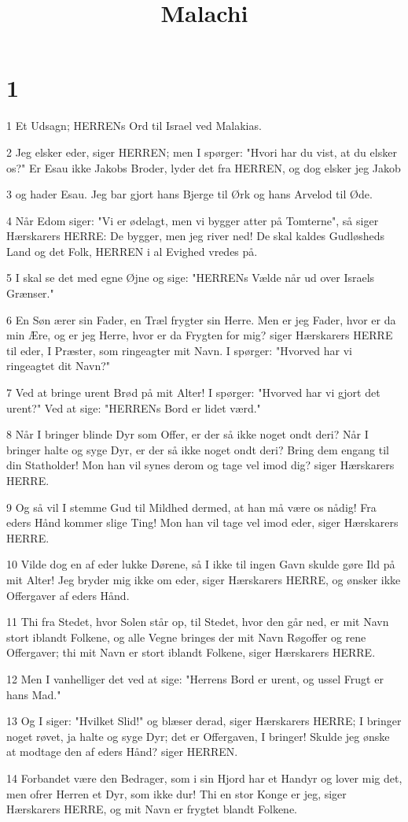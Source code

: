 

\title{Malachi}


\chapter{1}

\par 1 Et Udsagn; HERRENs Ord til Israel ved Malakias.
\par 2 Jeg elsker eder, siger HERREN; men I spørger: "Hvori har du vist, at du elsker os?" Er Esau ikke Jakobs Broder, lyder det fra HERREN, og dog elsker jeg Jakob
\par 3 og hader Esau. Jeg bar gjort hans Bjerge til Ørk og hans Arvelod til Øde.
\par 4 Når Edom siger: "Vi er ødelagt, men vi bygger atter på Tomterne", så siger Hærskarers HERRE: De bygger, men jeg river ned! De skal kaldes Gudløsheds Land og det Folk, HERREN i al Evighed vredes på.
\par 5 I skal se det med egne Øjne og sige: "HERRENs Vælde når ud over Israels Grænser."
\par 6 En Søn ærer sin Fader, en Træl frygter sin Herre. Men er jeg Fader, hvor er da min Ære, og er jeg Herre, hvor er da Frygten for mig? siger Hærskarers HERRE til eder, I Præster, som ringeagter mit Navn. I spørger: "Hvorved har vi ringeagtet dit Navn?"
\par 7 Ved at bringe urent Brød på mit Alter! I spørger: "Hvorved har vi gjort det urent?" Ved at sige: "HERRENs Bord er lidet værd."
\par 8 Når I bringer blinde Dyr som Offer, er der så ikke noget ondt deri? Når I bringer halte og syge Dyr, er der så ikke noget ondt deri? Bring dem engang til din Statholder! Mon han vil synes derom og tage vel imod dig? siger Hærskarers HERRE.
\par 9 Og så vil I stemme Gud til Mildhed dermed, at han må være os nådig! Fra eders Hånd kommer slige Ting! Mon han vil tage vel imod eder, siger Hærskarers HERRE.
\par 10 Vilde dog en af eder lukke Dørene, så I ikke til ingen Gavn skulde gøre Ild på mit Alter! Jeg bryder mig ikke om eder, siger Hærskarers HERRE, og ønsker ikke Offergaver af eders Hånd.
\par 11 Thi fra Stedet, hvor Solen står op, til Stedet, hvor den går ned, er mit Navn stort iblandt Folkene, og alle Vegne bringes der mit Navn Røgoffer og rene Offergaver; thi mit Navn er stort iblandt Folkene, siger Hærskarers HERRE.
\par 12 Men I vanhelliger det ved at sige: "Herrens Bord er urent, og ussel Frugt er hans Mad."
\par 13 Og I siger: "Hvilket Slid!" og blæser derad, siger Hærskarers HERRE; I bringer noget røvet, ja halte og syge Dyr; det er Offergaven, I bringer! Skulde jeg ønske at modtage den af eders Hånd? siger HERREN.
\par 14 Forbandet være den Bedrager, som i sin Hjord har et Handyr og lover mig det, men ofrer Herren et Dyr, som ikke dur! Thi en stor Konge er jeg, siger Hærskarers HERRE, og mit Navn er frygtet blandt Folkene.

